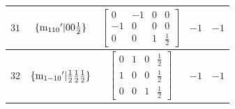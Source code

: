 \documentclass[fleqn,8pt]{jsarticle}
\begin{document}
\begin{longtable}{ccccc}
$ 31 $ & $ \{{\rm m}_{110}{}'|0 0 \frac{1}{2}\} $ & $ \begin{bmatrix} 0 & -1 & 0 & 0 \\ -1 & 0 & 0 & 0 \\ 0 & 0 & 1 & \frac{1}{2} \end{bmatrix} $ & $ -1 $ & $ -1 $ \\ \hline
$ 32 $ & $ \{{\rm m}_{1-10}{}'|\frac{1}{2} \frac{1}{2} \frac{1}{2}\} $ & $ \begin{bmatrix} 0 & 1 & 0 & \frac{1}{2} \\ 1 & 0 & 0 & \frac{1}{2} \\ 0 & 0 & 1 & \frac{1}{2} \end{bmatrix} $ & $ -1 $ & $ -1 $ \\
\end{longtable}
\end{document}
